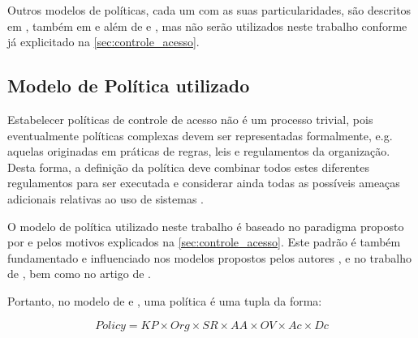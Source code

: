 Outros modelos de políticas, cada um com as suas particularidades, são descritos em , também em  e  além de  e , mas não serão utilizados neste trabalho conforme já explicitado na \autoref{sec:controle_acesso}.

\subsection{Modelo de Política utilizado}\label{modelo_politica_utilizada}
Estabelecer políticas de controle de acesso não é um processo trivial, pois eventualmente políticas complexas devem ser representadas formalmente, e.g. aquelas originadas em práticas de regras, leis e regulamentos da organização. Desta forma, a definição da política deve combinar todos estes diferentes regulamentos para ser executada e considerar ainda todas as possíveis ameaças adicionais relativas ao uso de sistemas \cite{di_vimercati_policies_2005}.

O modelo de política utilizado neste trabalho é baseado no paradigma proposto por  e  pelos motivos explicados na \autoref{sec:controle_acesso}. Este padrão é também fundamentado e influenciado nos modelos propostos pelos autores , e no trabalho de , bem como no artigo de .

Portanto, no modelo de  e , uma política é uma tupla da forma:

	\begin{equation}\label{politica}
	Policy = KP \times Org \times SR \times AA \times OV \times Ac \times Dc
	\end{equation}
	

